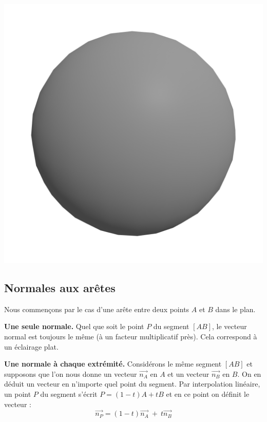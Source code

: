 \documentclass[11pt,class=report,crop=false]{standalone}
\begin{document}
\begin{center}
	\includegraphics[scale=\myscale,scale=0.15,trim={2cm 0 2cm 0},clip,]{figures/sphere-new-03}
\end{center}

\subsection{Normales aux arêtes}

Nous commençons par le cas d'une arête entre deux points $A$ et $B$ dans le plan.

\textbf{Une seule normale.}
Quel que soit le point $P$ du segment $[AB]$, le vecteur normal est toujours le même (à un facteur multiplicatif près). Cela correspond à un éclairage \og{}plat\fg{}.






\medskip
\textbf{Une normale à chaque extrémité.}
Considérons le même segment $[AB]$ et supposons que l'on nous donne un vecteur $\vec{n_A}$ en $A$ et un vecteur $\vec{n_B}$ en $B$. On en déduit un vecteur en n'importe quel point du segment. 
Par interpolation linéaire, un point $P$ du segment s'écrit $P = (1-t)A+tB$ et en ce point on définit le vecteur :
$$\vec{n_P} = (1-t)\vec{n_A} \  + \ t\vec{n_B}$$
\end{document}

